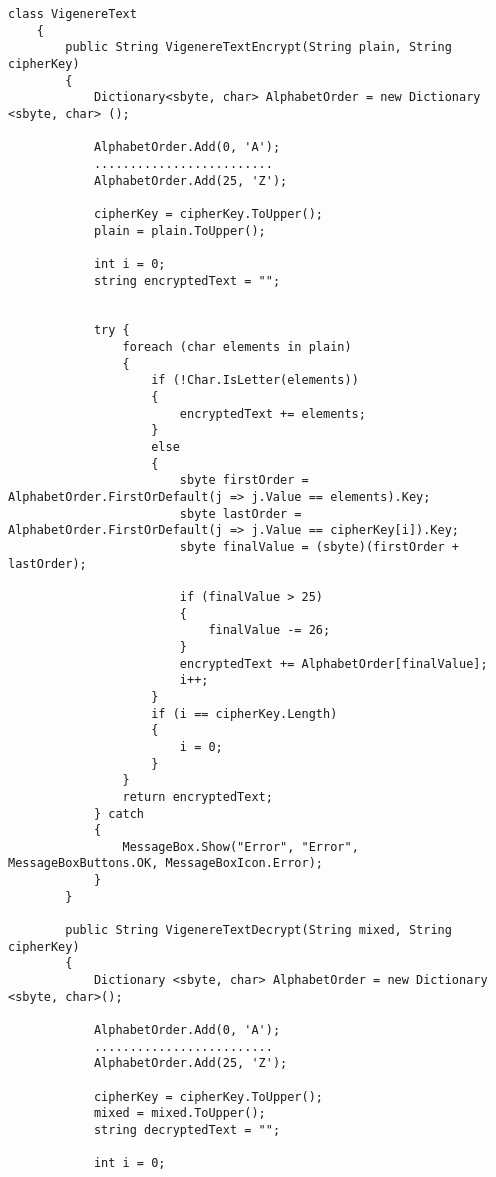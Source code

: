 \begin{lstlisting}[caption=Vigenère Cipher Text Source Code]
    class VigenereText
    {
        public String VigenereTextEncrypt(String plain, String cipherKey)
        {
            Dictionary<sbyte, char> AlphabetOrder = new Dictionary <sbyte, char> ();

            AlphabetOrder.Add(0, 'A'); 
            .........................
            AlphabetOrder.Add(25, 'Z');

            cipherKey = cipherKey.ToUpper();
            plain = plain.ToUpper();

            int i = 0;
            string encryptedText = "";


            try {
                foreach (char elements in plain)
                {
                    if (!Char.IsLetter(elements))
                    {
                        encryptedText += elements;
                    }
                    else
                    {
                        sbyte firstOrder = AlphabetOrder.FirstOrDefault(j => j.Value == elements).Key; 
                        sbyte lastOrder = AlphabetOrder.FirstOrDefault(j => j.Value == cipherKey[i]).Key;
                        sbyte finalValue = (sbyte)(firstOrder + lastOrder); 
                        
                        if (finalValue > 25) 
                        {
                            finalValue -= 26;
                        }
                        encryptedText += AlphabetOrder[finalValue]; 
                        i++;
                    }
                    if (i == cipherKey.Length) 
                    {
                        i = 0;
                    }
                }
                return encryptedText;
            } catch 
            {
                MessageBox.Show("Error", "Error", MessageBoxButtons.OK, MessageBoxIcon.Error);
            }
        }

        public String VigenereTextDecrypt(String mixed, String cipherKey)
        {
            Dictionary <sbyte, char> AlphabetOrder = new Dictionary <sbyte, char>();

            AlphabetOrder.Add(0, 'A'); 
            .........................
            AlphabetOrder.Add(25, 'Z');

            cipherKey = cipherKey.ToUpper();
            mixed = mixed.ToUpper();
            string decryptedText = "";

            int i = 0;


\end{lstlisting}
